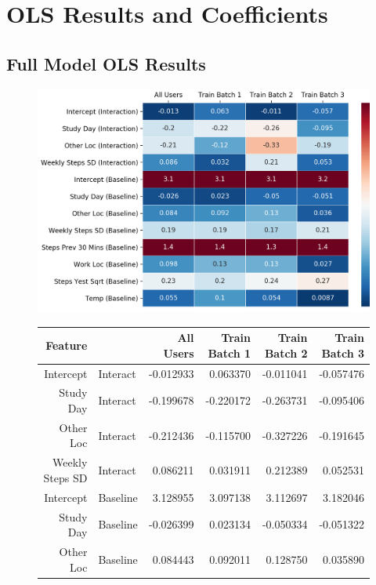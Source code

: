 \chapter{OLS Results and Coefficients}
\label{AppendixB}


\section{Full Model OLS Results}

\begin{figure}
\includegraphics[width=\textwidth]{figures/full_model_coefs_table.png}
\begin{tabular}{rl|rrrr}
\toprule
Feature & {} &  All Users &  Train Batch 1 &  Train Batch 2 &  Train Batch 3 \\
\midrule
Intercept & Interact       &  -0.012933 &       0.063370 &      -0.011041 &      -0.057476 \\
Study Day & Interact       &  -0.199678 &      -0.220172 &      -0.263731 &      -0.095406 \\
Other Loc & Interact       &  -0.212436 &      -0.115700 &      -0.327226 &      -0.191645 \\
Weekly Steps SD & Interact &   0.086211 &       0.031911 &       0.212389 &       0.052531 \\
\hline
Intercept & Baseline          &   3.128955 &       3.097138 &       3.112697 &       3.182046 \\
Study Day & Baseline          &  -0.026399 &       0.023134 &      -0.050334 &      -0.051322 \\
Other Loc & Baseline          &   0.084443 &       0.092011 &       0.128750 &       0.035890 \\

\end{tabular}
\end{figure}
